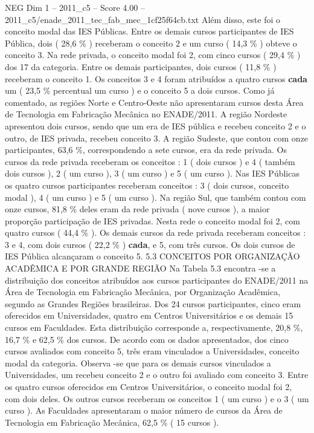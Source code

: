 \begin{textsample}{NEG Dim 1 – 2011\_c5 – Score 4.00 – 2011\_c5/enade\_2011\_tec\_fab\_mec\_1cf25f64cb.txt}
Além disso, este foi o conceito modal das IES Públicas.
Entre os demais cursos participantes de IES Pública, dois ( 28,6 \% ) receberam o conceito 2 e um curso ( 14,3 \% ) obteve o conceito 3.
Na rede privada, o conceito modal foi 2, com cinco cursos ( 29,4 \% ) dos 17 da categoria.
Entre os demais participantes, dois cursos ( 11,8 \% ) receberam o conceito 1.
Os conceitos 3 e 4 foram atribuídos a quatro cursos \textbf{cada} um ( 23,5 \% percentual um curso ) e o conceito 5 a dois cursos.
Como já comentado, as regiões Norte e Centro-Oeste não apresentaram cursos desta Área de Tecnologia em Fabricação Mecânica no ENADE/2011.
A região Nordeste apresentou dois cursos, sendo que um era de IES pública e recebeu conceito 2 e o outro, de IES privada, recebeu conceito 3.
A região Sudeste, que contou com onze participantes, 63,6 \%, correspondendo a sete cursos, era da rede privada.
Os cursos da rede privada receberam os conceitos : 1 ( dois cursos ) e 4 ( também dois cursos ), 2 ( um curso ), 3 ( um curso ) e 5 ( um curso ).
Nas IES Públicas os quatro cursos participantes receberam conceitos : 3 ( dois cursos, conceito modal ), 4 ( um curso ) e 5 ( um curso ).
Na região Sul, que também contou com onze cursos, 81,8 \% deles eram da rede privada ( nove cursos ), a maior proporção participação de IES privadas.
Nesta rede o conceito modal foi 2, com quatro cursos ( 44,4 \% ).
Os demais cursos da rede privada receberam conceitos : 3 e 4, com dois cursos ( 22,2 \% ) \textbf{cada}, e 5, com três cursos.
Os dois cursos de IES Pública alcançaram o conceito 5. 5.3 CONCEITOS POR ORGANIZAÇÃO ACADÊMICA E POR GRANDE REGIÃO Na Tabela 5.3 encontra -se a distribuição dos conceitos atribuídos aos cursos participantes do ENADE/2011 na Área de Tecnologia em Fabricação Mecânica, por Organização Acadêmica, segundo as Grandes Regiões brasileiras.
Dos 24 cursos participantes, cinco eram oferecidos em Universidades, quatro em Centros Universitários e os demais 15 cursos em Faculdades.
Esta distribuição corresponde a, respectivamente, 20,8 \%, 16,7 \% e 62,5 \% dos cursos.
De acordo com os dados apresentados, dos cinco cursos avaliados com conceito 5, três eram vinculados a Universidades, conceito modal da categoria.
Observa -se que para os demais cursos vinculados a Universidades, um recebeu conceito 2 e o outro foi avaliado com conceito 3.
Entre os quatro cursos oferecidos em Centros Universitários, o conceito modal foi 2, com dois deles.
Os outros cursos receberam os conceitos 1 ( um curso ) e o 3 ( um curso ).
As Faculdades apresentaram o maior número de cursos da Área de Tecnologia em Fabricação Mecânica, 62,5 \% ( 15 cursos ).

\end{textsample}
